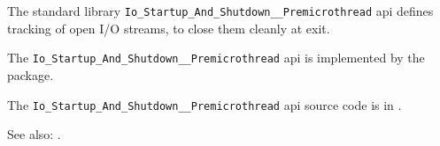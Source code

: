 
The standard library {\tt Io\_Startup\_And\_Shutdown\_\_Premicrothread} api defines tracking of open I/O streams, to close them cleanly at exit.

The {\tt Io\_Startup\_And\_Shutdown\_\_Premicrothread} api is implemented by the  package.

The {\tt Io\_Startup\_And\_Shutdown\_\_Premicrothread} api source code is in .

See also: .





